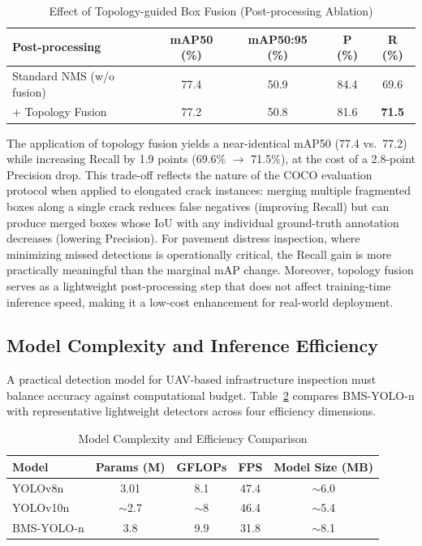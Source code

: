 \begin{table}[!t]
\caption{Effect of Topology-guided Box Fusion (Post-processing Ablation)}
\label{tab:topology}
\centering
\setlength{\tabcolsep}{4pt}
\begin{tabular}{l|c|c|c|c}
\hline
\hline
Post-processing & mAP50 (\%) & mAP50:95 (\%) & P (\%) & R (\%) \\
\hline
Standard NMS (w/o fusion) & 77.4 & 50.9 & 84.4 & 69.6 \\
+ Topology Fusion & 77.2 & 50.8 & 81.6 & \textbf{71.5} \\
\hline
\end{tabular}
\end{table}

The application of topology fusion yields a near-identical mAP50 (77.4 vs.\ 77.2) while increasing Recall by 1.9 points (69.6\% $\rightarrow$ 71.5\%), at the cost of a 2.8-point Precision drop. This trade-off reflects the nature of the COCO evaluation protocol when applied to elongated crack instances: merging multiple fragmented boxes along a single crack reduces false negatives (improving Recall) but can produce merged boxes whose IoU with any individual ground-truth annotation decreases (lowering Precision). For pavement distress inspection, where minimizing missed detections is operationally critical, the Recall gain is more practically meaningful than the marginal mAP change. Moreover, topology fusion serves as a lightweight post-processing step that does not affect training-time inference speed, making it a low-cost enhancement for real-world deployment.

\subsection{Model Complexity and Inference Efficiency}
\label{sec:complexity}

A practical detection model for UAV-based infrastructure inspection must balance accuracy against computational budget. Table~\ref{tab:complexity} compares BMS-YOLO-n with representative lightweight detectors across four efficiency dimensions.

\begin{table}[!t]
\caption{Model Complexity and Efficiency Comparison}
\label{tab:complexity}
\centering
\setlength{\tabcolsep}{4pt}
\begin{tabular}{l|c|c|c|c}
\hline
\hline
Model & Params (M) & GFLOPs & FPS & Model Size (MB) \\
\hline
YOLOv8n  & 3.01 & 8.1 & 47.4 & $\sim$6.0 \\
YOLOv10n & $\sim$2.7 & $\sim$8 & 46.4 & $\sim$5.4 \\
BMS-YOLO-n & 3.8 & 9.9 & 31.8 & $\sim$8.1 \\
\hline
\end{tabular}
\end{table}


